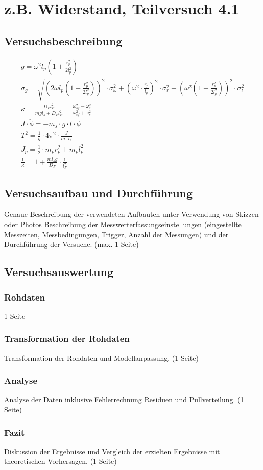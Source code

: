\documentclass[12pt,a4paper]{article}
\author{Gruppe C14 \\ Julián Häck, Martin Koytek, Lars Wenning, Erik Zimmermann}
\begin{document}
\section{z.B. Widerstand, Teilversuch 4.1}
\subsection{Versuchsbeschreibung}
\begin{align*}
g=\omega^2 l_p (1+\frac{r_p^2}{2 l_p^2}) \\
\sigma_g=\sqrt{(2\omega l_p (1+\frac{r_p^2}{2 l_p^2}))^2 \cdot \sigma_{\omega}^2+(\omega^2 \cdot \frac{r_p}{l_p})^2 \cdot \sigma_r^2+(\omega^2(1-\frac{r_p^2}{2 l_p^2}))^2 \cdot \sigma_l^2} \\
\kappa =\frac{D_F l_F^2}{mgl_s + D_F l_F^2}= \frac{\omega_{sf}^2-\omega_{s}^2}{\omega_{sf}^2+\omega_s^2} \\
J \cdot \ddot{\phi} = -m_s \cdot g \cdot l \cdot \phi \\
T^2=\frac{1}{g} \cdot 4\pi^2 \cdot \frac{J}{m \cdot l_s} \\
J_p=\frac{1}{2} \cdot m_p r_p^2 + m_p l_p^2 \\
\frac{1}{\kappa}=1+\frac{ml_sg}{D_F}\cdot \frac{1}{l_F^2}
\end{align*}
\subsection{Versuchsaufbau und Durchführung}
Genaue Beschreibung der verwendeten Aufbauten unter Verwendung von Skizzen oder Photos
Beschreibung der Messwerterfassungseinstellungen (eingestellte Messzeiten, Messbedingungen,
Trigger, Anzahl der Messungen) und der Durchführung der Versuche. (max. 1 Seite)
\subsection{Versuchsauswertung}

\subsubsection{Rohdaten}
1 Seite
\subsubsection{Transformation der Rohdaten}
Transformation der Rohdaten und Modellanpassung. (1 Seite)
\subsubsection{Analyse}
Analyse der Daten inklusive Fehlerrechnung Residuen und Pullverteilung. (1 Seite)
\subsubsection{Fazit}
Diskussion der Ergebnisse und Vergleich der erzielten Ergebnisse mit theoretischen Vorhersagen.
(1 Seite)
\end{document}
